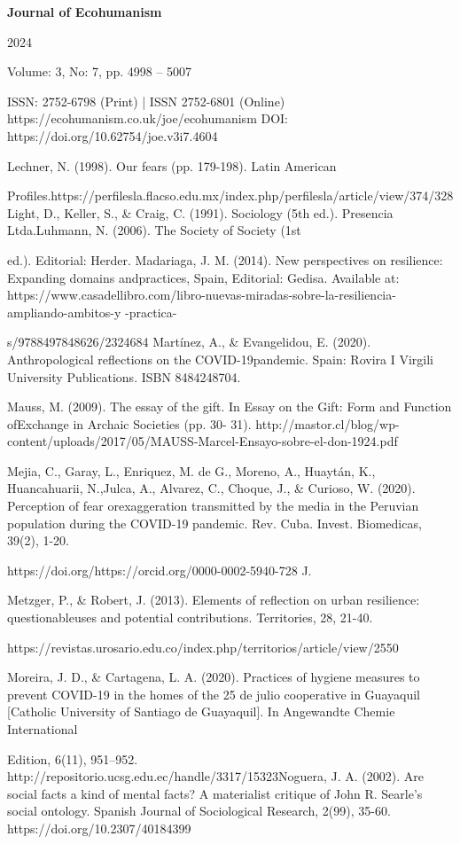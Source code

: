 \documentclass{article}
\begin{document}
\textbf{Journal of Ecohumanism}

2024

Volume: 3, No: 7, pp. 4998 – 5007

ISSN: 2752-6798 (Print) | ISSN 2752-6801 (Online) https://ecohumanism.co.uk/joe/ecohumanism DOI: https://doi.org/10.62754/joe.v3i7.4604

Lechner, N. (1998). Our fears (pp. 179-198). Latin American

Profiles.https://perfilesla.flacso.edu.mx/index.php/perfilesla/article/view/374/328 Light, D., Keller, S., \& Craig, C. (1991). Sociology (5th ed.). Presencia Ltda.Luhmann, N. (2006). The Society of Society (1st

ed.). Editorial: Herder. Madariaga, J. M. (2014). New perspectives on resilience: Expanding domains andpractices, Spain, Editorial: Gedisa. Available at: https://www.casadellibro.com/libro-nuevas-miradas-sobre-la-resiliencia-ampliando-ambitos-y -practica-

s/9788497848626/2324684 Martínez, A., \& Evangelidou, E. (2020). Anthropological reflections on the COVID-19pandemic. Spain: Rovira I Virgili University Publications. ISBN 8484248704.

Mauss, M. (2009). The essay of the gift. In Essay on the Gift: Form and Function ofExchange in Archaic Societies (pp. 30- 31). http://mastor.cl/blog/wp-content/uploads/2017/05/MAUSS-Marcel-Ensayo-sobre-el-don-1924.pdf

Mejia, C., Garay, L., Enriquez, M. de G., Moreno, A., Huaytán, K., Huancahuarii, N.,Julca, A., Alvarez, C., Choque, J., \& Curioso, W. (2020). Perception of fear orexaggeration transmitted by the media in the Peruvian population during the COVID-19 pandemic. Rev. Cuba. Invest. Biomedicas, 39(2), 1-20.

https://doi.org/https://orcid.org/0000-0002-5940-728 J.

Metzger, P., \& Robert, J. (2013). Elements of reflection on urban resilience: questionableuses and potential contributions. Territories, 28, 21-40.

https://revistas.urosario.edu.co/index.php/territorios/article/view/2550

Moreira, J. D., \& Cartagena, L. A. (2020). Practices of hygiene measures to prevent COVID-19 in the homes of the 25 de julio cooperative in Guayaquil [Catholic University of Santiago de Guayaquil]. In Angewandte Chemie International

Edition, 6(11), 951–952. http://repositorio.ucsg.edu.ec/handle/3317/15323Noguera, J. A. (2002). Are social facts a kind of mental facts? A materialist critique of John R. Searle's social ontology. Spanish Journal of Sociological Research, 2(99), 35-60. https://doi.org/10.2307/40184399
\end{document}
